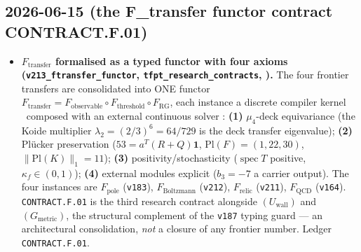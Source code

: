 \subsection*{2026-06-15 (the F\_transfer functor contract CONTRACT.F.01)}
\begin{itemize}
\item \textbf{$F_{\mathrm{transfer}}$ formalised as a typed functor with four axioms
  (\texttt{v213\_ftransfer\_functor}, \texttt{tfpt\_research\_contracts}, \mC).} The four frontier transfers
  are consolidated into ONE functor $F_{\mathrm{transfer}}=F_{\mathrm{observable}}\circ F_{\mathrm{threshold}}
  \circ F_{\mathrm{RG}}$, each instance a discrete compiler kernel \mE\ composed with an external continuous
  solver \mC: \textbf{(1)} $\mu_4$-deck equivariance (the Koide multiplier $\lambda_2{=}(2/3)^6{=}64/729$ is
  the deck transfer eigenvalue); \textbf{(2)} Pl\"ucker preservation ($53{=}a^T(R{+}Q)\mathbf1$,
  $\mathrm{Pl}(F){=}(1,22,30)$, $\|\mathrm{Pl}(K)\|_1{=}11$); \textbf{(3)} positivity/stochasticity
  ($\operatorname{spec}T$ positive, $\kappa_f\in(0,1)$); \textbf{(4)} external modules explicit
  ($b_3{=}{-}7$ a carrier output). The four instances are $F_{\mathrm{pole}}$ (\texttt{v183}),
  $F_{\mathrm{Boltzmann}}$ (\texttt{v212}), $F_{\mathrm{relic}}$ (\texttt{v211}), $F_{\mathrm{QCD}}$
  (\texttt{v164}). \texttt{CONTRACT.F.01} is the third research contract alongside $(U_{\mathrm{wall}})$ and
  $(G_{\mathrm{metric}})$, the structural complement of the \texttt{v187} typing guard --- an architectural
  consolidation, \emph{not} a closure of any frontier number. Ledger \texttt{CONTRACT.F.01}.
\end{itemize}

